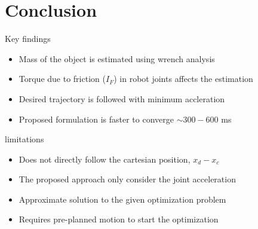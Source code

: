 
\section{Conclusion}

\begin{frame}{Key findings}

	\begin{itemize}
		\item
		Mass of the object is estimated using wrench analysis
		\pause
		
		\item
		Torque due to friction ($I_F$) in robot joints affects the estimation
		\pause 
		
		\item
		Desired trajectory is followed with minimum accleration %
		\pause
		
		\item
		Proposed formulation is faster to converge $\sim 300-600$ ms		
	
	\end{itemize}

\end{frame}



\begin{frame}{limitations}
	
	\begin{itemize}
		\item
		Does not directly follow the cartesian position, $x_d-x_c$
		\pause
		
		\item
		The proposed approach only consider the joint acceleration %
		\pause
		
		\item
		Approximate solution to the given optimization problem
		\pause
		
		\item
		Requires pre-planned motion to start the optimization
		
	\end{itemize}
	
\end{frame}

\thanksframe


